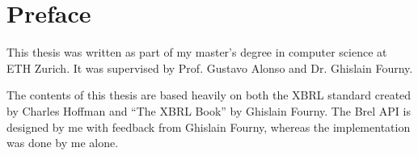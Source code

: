 \section{Preface}

This thesis was written as part of my master's degree in computer science at ETH Zurich.
It was supervised by Prof. Gustavo Alonso and Dr. Ghislain Fourny.


The contents of this thesis are based heavily on both the XBRL standard\cite{xbrl} created by Charles Hoffman and ``The XBRL Book''\cite{fourny2023xbrl} by Ghislain Fourny.
The Brel API is designed by me with feedback from Ghislain Fourny,
whereas the implementation was done by me alone.